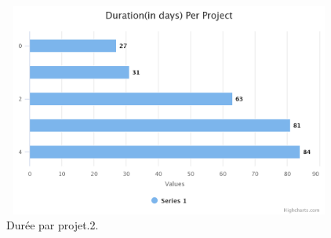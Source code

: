 \FloatBarrier
\begin{figure}[H]
\center
\includegraphics[width=11cm,height=7cm]{./figures/pres/durationin-days-per-proj.png}
\caption{Dur\'{e}e par projet.2.}
\end{figure}
\FloatBarrier









\newpage






